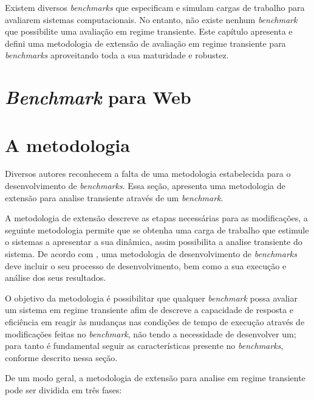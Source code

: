 
Existem diversos \textit{benchmarks} que especificam e simulam cargas de trabalho para avaliarem sistemas computacionais. No entanto, não existe nenhum \textit{benchmark} que possibilite uma avaliação em regime transiente. Este capítulo apresenta e defini uma metodologia de extensão de avaliação em regime transiente para \textit{benchmarks} aproveitando toda a sua maturidade e robustez.


\section{\textit{Benchmark} para Web}
\label{sec-benchmark-web}

\section{A metodologia}
\label{sec-method}

Diversos autores \cite{Hinnant1988, Price1989, KaiSachs2010, Folkerts2013, Marco2012} reconhecem a falta de uma metodologia estabelecida para o desenvolvimento de \textit{benchmarks}. Essa seção, apresenta uma metodologia de extensão para analise transiente através de um \textit{benchmark}. 

A metodologia de extensão descreve as etapas necessárias para as modificações, a seguinte metodologia permite que se obtenha uma carga de trabalho que estimule o sistemas a apresentar a sua dinâmica, assim possibilita a analise transiente do sistema. De acordo com \cite{KaiSachs2010}, uma metodologia de desenvolvimento de \textit{benchmarks} deve incluir o seu processo de desenvolvimento, bem como a sua execução e análise dos seus resultados. 

O objetivo da metodologia é possibilitar que qualquer \textit{benchmark} possa avaliar um sistema em regime transiente afim de descreve a capacidade de resposta e eficiência em reagir às mudanças nas condições de tempo de execução através de modificações feitas no \textit{benchmark}, não tendo a necessidade de desenvolver um; para tanto é fundamental seguir as características presente no \textit{benchmarks}, conforme descrito nessa seção.

De um modo geral, a metodologia de extensão para analise em regime transiente pode ser dividida em três fases:

